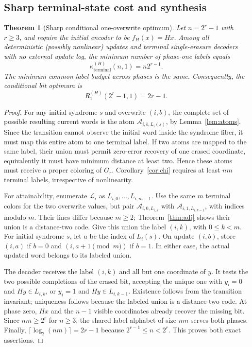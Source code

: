 \documentclass[11pt,a4paper]{article}
\newtheorem{theorem}{Theorem}[section]
\begin{document}
\subsection{Sharp terminal-state cost and synthesis}
\begin{theorem}[Sharp conditional one-overwrite optimum]\label{thm:optimal}
Let $n=2^r-1$ with $r\ge3$, and require the initial encoder to be $f_H(x)=Hx$. Among \emph{all} deterministic (possibly nonlinear) updates and terminal single-erasure decoders with no external update log, the minimum number of phase-one labels equals
\[
\boxed{\quad \kappa^{(H)}_{\mathrm{terminal}}(n,1)=n2^{r-1}.\quad}
\]
The minimum common label budget across phases is the same. Consequently, the \emph{conditional} bit optimum is
\[
\boxed{\quad R_1^{(H)}(2^r-1,1)=2r-1.\quad}
\]
\end{theorem}
\begin{proof}
For any initial syndrome $s$ and overwrite $(i,b)$, the complete set of possible resulting current words is the atom $\mathcal A_{i,b,L_i(s)}$, by Lemma~\ref{lem:atoms}. Since the transition cannot observe the initial word inside the syndrome fiber, it must map this entire atom to one terminal label. If two atoms are mapped to the same label, their union must permit zero-error recovery of one erased coordinate, equivalently it must have minimum distance at least two. Hence these atoms must receive a proper coloring of $G_r$. Corollary~\ref{cor:chi} requires at least $nm$ terminal labels, irrespective of nonlinearity.

For attainability, enumerate $\mathscr L_i$ as $L_{i,0},\ldots,L_{i,m-1}$. Use the same $m$ terminal colors for the two overwrite values, but pair $\mathcal A_{i,0,L_{i,k}}$ with $\mathcal A_{i,1,L_{i,k-1}}$, with indices modulo $m$. Their lines differ because $m\ge2$; Theorem~\ref{thm:adj} shows their union is a distance-two code. Give this union the label $(i,k)$, with $0\le k<m$. For initial syndrome $s$, let $a$ be the index of $L_i(s)$. On update $(i,b)$, store $(i,a)$ if $b=0$ and $(i,a+1\pmod m)$ if $b=1$. In either case, the actual updated word belongs to its labeled union.

The decoder receives the label $(i,k)$ and all but one coordinate of $y$. It tests the two possible completions of the erased bit, accepting the unique one with $y_i=0$ and $Hy\in L_{i,k}$, or $y_i=1$ and $Hy\in L_{i,k-1}$. Existence follows from the transition invariant; uniqueness follows because the labeled union is a distance-two code. At phase zero, $Hx$ and the $n-1$ visible coordinates already recover the missing bit. Since $nm\ge 2^r$ for $n\ge3$, the shared label alphabet of size $nm$ serves both phases. Finally, $\lceil\log_2(nm)\rceil =2r-1$ because $2^{r-1}\le n<2^r$. This proves both exact assertions.
\end{proof}
\end{document}
